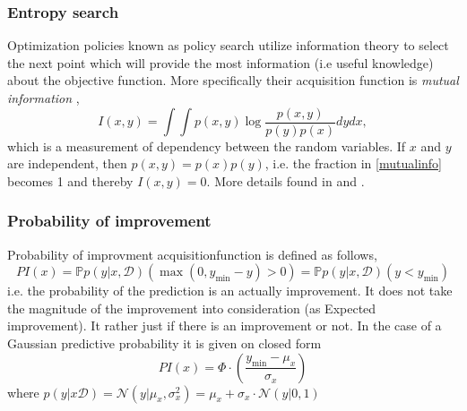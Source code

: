 \subsubsection{Entropy search}
Optimization policies known as policy search utilize information theory to select the next point
which will provide the most information (i.e useful knowledge) about the objective function. 
More specifically their acquisition function is \textit{mutual information} \cite[135-140]{bayesoptbook}, 
\begin{equation}\label{mutualinfo}
    I(x,y) = \int \int p(x,y) \log \frac{p(x,y)}{p(y)p(x)} dy dx,
\end{equation}
which is a measurement of dependency between the random variables. If $x$ and $y$ are independent, then
$p(x,y) = p(x)p(y)$, i.e. the fraction in \eqref{mutualinfo} becomes 1 and thereby $I(x,y) = 0$. 
More details found in \cite{PredEntropy} and \cite{entropysearch}. 







\subsubsection{Probability of improvement}
Probability of improvment acquisitionfunction is defined as follows, 
$$PI(x) = \mathbb{P}{p(y|x,\mathcal{D})}(\max(0,y_{\min}-y)>0) =
\mathbb{P}{p(y|x,\mathcal{D})}(y<y_{\min})$$ i.e. the probability of the prediction is an actually
improvement. It does not take the magnitude of the improvement into consideration (as Expected
improvement). It rather just if there is an improvement or not. In the case of a Gaussian predictive
probability it is given on closed form
$$PI(x) = \Phi·\left(\frac{y_{\min}-\mu_x}{\sigma_x}\right)$$
where $p(y|x\mathcal{D}) =\mathcal{N}(y|\mu_x,\sigma_x^2) =\mu_x + \sigma_x\cdot\mathcal{N}(y|0,1)$

